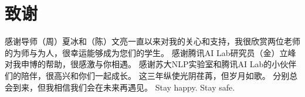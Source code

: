 \chapter{致谢}
感谢导师（周）夏冰和（陈）文亮一直以来对我的关心和支持，我很欣赏两位老师的为师与为人，很幸运能够成为您们的学生。
感谢腾讯AI Lab研究员（金）立峰对我申博的帮助，很感激与你相遇。
感谢苏大NLP实验室和腾讯AI Lab的小伙伴们的陪伴，很高兴和你们一起成长。
这三年纵使光阴荏苒，但岁月如歌。
分别总会到来，但我相信我们会在未来再遇见。
Stay happy. Stay safe.
